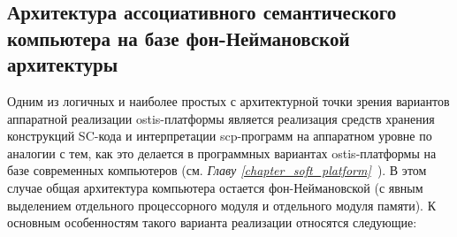 \subsection{Архитектура ассоциативного семантического компьютера на базе фон-Неймановской архитектуры}
Одним из логичных и наиболее простых с архитектурной точки зрения вариантов аппаратной реализации ostis-платформы является реализация средств хранения конструкций SC-кода и интерпретации scp-программ на аппаратном уровне по аналогии с тем, как это делается в программных вариантах ostis-платформы на базе современных компьютеров (см. \textit{Главу \ref{chapter_soft_platform}~}). В этом случае общая архитектура компьютера остается фон-Неймановской (с явным выделением отдельного процессорного модуля и отдельного модуля памяти). К основным особенностям такого варианта реализации относятся следующие:
